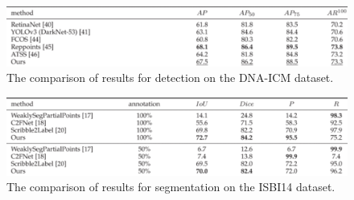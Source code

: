 \begin{figure}[H]
    \begin{centering}
    \includegraphics[width=14cm]{assets/images/rw-ts-det.png}
    \par\end{centering}
    \caption{The comparison of results for detection on the DNA-ICM dataset.}
    \label{fig:rw-ts-det}
\end{figure}

\begin{figure}[H]
    \begin{centering}
    \includegraphics[width=14cm]{assets/images/rw-ts-seg-2.png}
    \par\end{centering}
    \caption{The comparison of results for segmentation on the ISBI14 dataset.}
    \label{fig:rw-ts-seg-2}
\end{figure}